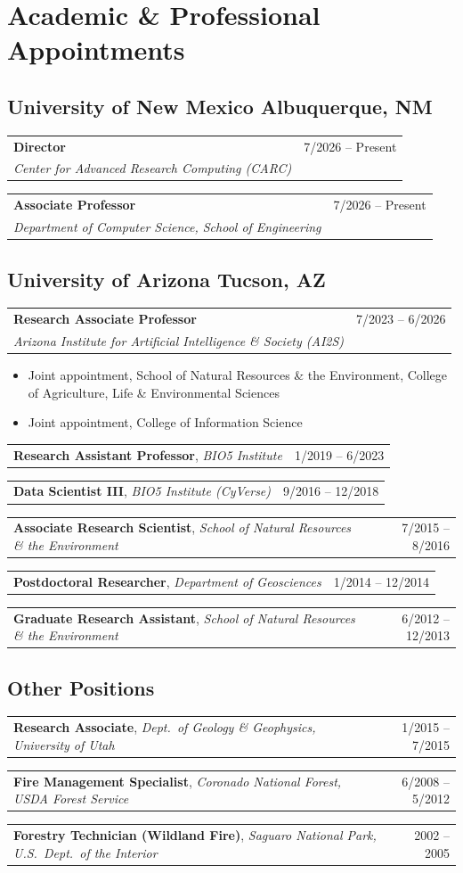 \documentclass[11pt,letterpaper]{article}
\makeatletter
\newcommand{\role}[4]{%
  \begin{tabularx}{\linewidth}{@{}X r@{}}
    \textbf{#1} & {\small #2}\\
    \textit{#3} & {\small\color{muted}#4}
  \end{tabularx}\par\vspace{4pt}}
\newcommand{\roleline}[3]{%
  \begin{tabularx}{\linewidth}{@{}X r@{}}
    \textbf{#1}, \textit{#2} & {\small #3}
  \end{tabularx}\par\vspace{2pt}}
\makeatother
\begin{document}
\section{Academic \& Professional Appointments}

\subsection{University of New Mexico \hfill{\normalfont\small\color{muted}Albuquerque, NM}}
\role{Director}{7/2026 -- Present}{Center for Advanced Research Computing (CARC)}{}
\role{Associate Professor}{7/2026 -- Present}{Department of Computer Science, School of Engineering}{}

\subsection{University of Arizona \hfill{\normalfont\small\color{muted}Tucson, AZ}}
\role{Research Associate Professor}{7/2023 -- 6/2026}{Arizona Institute for Artificial Intelligence \& Society (AI2S)}{}
\vspace{-3pt}
\begin{itemize}
  \item Joint appointment, School of Natural Resources \& the Environment, College of Agriculture, Life \& Environmental Sciences
  \item Joint appointment, College of Information Science
\end{itemize}
\vspace{4pt}
\roleline{Research Assistant Professor}{BIO5 Institute}{1/2019 -- 6/2023}
\roleline{Data Scientist III}{BIO5 Institute (CyVerse)}{9/2016 -- 12/2018}
\roleline{Associate Research Scientist}{School of Natural Resources \& the Environment}{7/2015 -- 8/2016}
\roleline{Postdoctoral Researcher}{Department of Geosciences}{1/2014 -- 12/2014}
\roleline{Graduate Research Assistant}{School of Natural Resources \& the Environment}{6/2012 -- 12/2013}

\subsection{Other Positions}
\roleline{Research Associate}{Dept.\ of Geology \& Geophysics, University of Utah}{1/2015 -- 7/2015}
\roleline{Fire Management Specialist}{Coronado National Forest, USDA Forest Service}{6/2008 -- 5/2012}
\roleline{Forestry Technician (Wildland Fire)}{Saguaro National Park, U.S.\ Dept.\ of the Interior}{2002 -- 2005}
\end{document}
